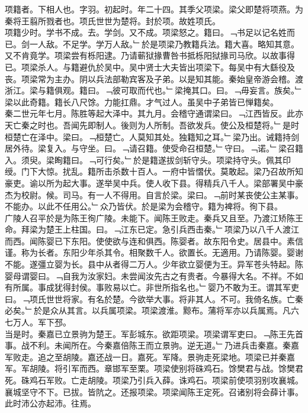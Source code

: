 \documentclass{zhvt-classic}
\begin{document}
\hspace*{2em}项籍者。下相人也。字羽。初起时。年二十四。其季父项梁。梁父即楚将项燕。为秦将王翦所戮者也。项氏世世为楚将。封於项。故姓项氏。\\
\hspace*{2em}项籍少时。学书不成。去。学剑。又不成。项梁怒之。籍曰。﹁书足以记名姓而已。剑一人敌。不足学。学万人敌。﹂於是项梁乃教籍兵法。籍大喜。略知其意。又不肯竟学。项梁尝有栎阳逮。乃请蕲狱掾曹咎书抵栎阳狱掾司马欣。以故事得已。项梁杀人。与籍避仇於吴中。吴中贤士大夫皆出项梁下。每吴中有大繇役及丧。项梁常为主办。阴以兵法部勒宾客及子弟。以是知其能。秦始皇帝游会稽。渡浙江。梁与籍俱观。籍曰。﹁彼可取而代也。﹂梁掩其口。曰。﹁毋妄言。族矣。﹂梁以此奇籍。籍长八尺馀。力能扛鼎。才气过人。虽吴中子弟皆已惮籍矣。\\
\hspace*{2em}秦二世元年七月。陈胜等起大泽中。其九月。会稽守通谓梁曰。﹁江西皆反。此亦天亡秦之时也。吾闻先即制人。後则为人所制。吾欲发兵。使公及桓楚将。﹂是时桓楚亡在泽中。梁曰。﹁桓楚亡。人莫知其处。独籍知之耳。﹂梁乃出。诫籍持剑居外待。梁复入。与守坐。曰。﹁请召籍。使受命召桓楚。﹂守曰。﹁诺。﹂梁召籍入。须臾。梁眴籍曰。﹁可行矣。﹂於是籍遂拔剑斩守头。项梁持守头。佩其印绶。门下大惊。扰乱。籍所击杀数十百人。一府中皆慴伏。莫敢起。梁乃召故所知豪吏。谕以所为起大事。遂举吴中兵。使人收下县。得精兵八千人。梁部署吴中豪杰为校尉。候。司马。有一人不得用。自言於梁。梁曰。﹁前时某丧使公主某事。不能办。以此不任用公。﹂众乃皆伏。於是梁为会稽守。籍为裨将。徇下县。\\
\hspace*{2em}广陵人召平於是为陈王徇广陵。未能下。闻陈王败走。秦兵又且至。乃渡江矫陈王命。拜梁为楚王上柱国。曰。﹁江东已定。急引兵西击秦。﹂项梁乃以八千人渡江而西。闻陈婴已下东阳。使使欲与连和俱西。陈婴者。故东阳令史。居县中。素信谨。称为长者。东阳少年杀其令。相聚数千人。欲置长。无適用。乃请陈婴。婴谢不能。遂彊立婴为长。县中从者得二万人。少年欲立婴便为王。异军苍头特起。陈婴母谓婴曰。﹁自我为汝家妇。未尝闻汝先古之有贵者。今暴得大名。不祥。不如有所属。事成犹得封侯。事败易以亡。非世所指名也。﹂婴乃不敢为王。谓其军吏曰。﹁项氏世世将家。有名於楚。今欲举大事。将非其人。不可。我倚名族。亡秦必矣。﹂於是众从其言。以兵属项梁。项梁渡淮。黥布。蒲将军亦以兵属焉。凡六七万人。军下邳。\\
\hspace*{2em}当是时。秦嘉已立景驹为楚王。军彭城东。欲距项梁。项梁谓军吏曰。﹁陈王先首事。战不利。未闻所在。今秦嘉倍陈王而立景驹。逆无道。﹂乃进兵击秦嘉。秦嘉军败走。追之至胡陵。嘉还战一日。嘉死。军降。景驹走死梁地。项梁已并秦嘉军。军胡陵。将引军而西。章邯军至栗。项梁使别将硃鸡石。馀樊君与战。馀樊君死。硃鸡石军败。亡走胡陵。项梁乃引兵入薛。诛鸡石。项梁前使项羽别攻襄城。襄城坚守不下。已拔。皆阬之。还报项梁。项梁闻陈王定死。召诸别将会薛计事。此时沛公亦起沛。往焉。\\
\end{document}
